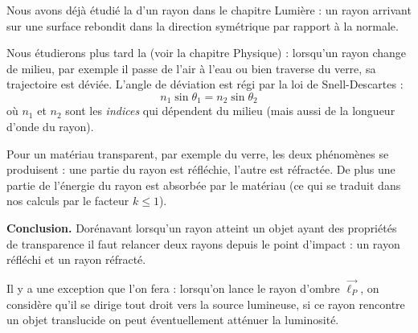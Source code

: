 \documentclass[11pt,class=report,crop=false]{standalone}
\begin{document}
Nous avons déjà étudié la  d'un rayon dans le chapitre \og{}Lumière\fg{} :
un rayon arrivant sur une surface rebondit dans la direction symétrique par rapport à la normale.

\begin{minipage}{0.49\textwidth}
\end{minipage}	
\begin{minipage}{0.49\textwidth}
\end{minipage}

\medskip

Nous étudierons plus tard la  (voir la chapitre \og{}Physique\fg{}) : lorsqu'un rayon change de milieu, par exemple il passe de l'air à l'eau ou bien traverse du verre, sa trajectoire est déviée. L'angle de déviation est régi par la loi de Snell-Descartes :
$$n_1 \sin \theta_1 = n_2 \sin \theta_2$$
où $n_1$ et $n_2$ sont les \emph{indices} qui dépendent du milieu (mais aussi de la longueur d'onde du rayon).

Pour un matériau transparent, par exemple du verre, les deux phénomènes se produisent : une partie du rayon est réfléchie, l'autre est réfractée. De plus une partie de l'énergie du rayon est absorbée par le matériau (ce qui se traduit dans nos calculs par le facteur $k \le 1$).



\textbf{Conclusion.} Dorénavant lorsqu'un rayon atteint un objet ayant des propriétés de transparence il faut relancer deux rayons depuis le point d'impact : un rayon réfléchi et un rayon réfracté.



Il y a une exception que l'on fera : lorsqu'on lance le rayon d'ombre $\vec{\ell_P}$, on considère qu'il se dirige tout droit vers la source lumineuse, si ce rayon rencontre un objet translucide on peut éventuellement atténuer la luminosité.

\end{document}
